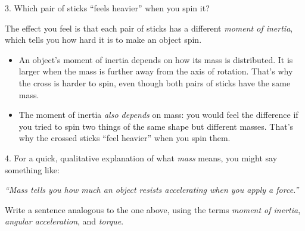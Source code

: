 3.  Which pair of sticks ``feels heavier'' when you spin it?
\answerspace{0.3in}

The effect you feel is that each pair of sticks has a different \textit{moment of inertia}, which tells you how hard it is to make an object spin.  
\begin{itemize}[nosep]
\item An object's moment of inertia depends on how its mass is distributed.  It is larger when the mass is further away from the axis of rotation.  That's why the cross is harder to spin, even though both pairs of sticks have the same mass.

\item The moment of inertia \textit{also depends} on mass: you would feel the difference if you tried to spin two things of the same shape but different masses.  That's why the crossed sticks ``feel heavier'' when you spin them.  
\end{itemize}
4. For a quick, qualitative explanation of what \textit{mass} means, you might say something like:

\phantom{indent05}\textit{``Mass tells you how much an object resists accelerating when you apply a force.''}

Write a sentence analogous to the one above, using the terms \textit{moment of inertia}, \textit{angular acceleration}, and \textit{torque}.
\answerspace{0.3in}




